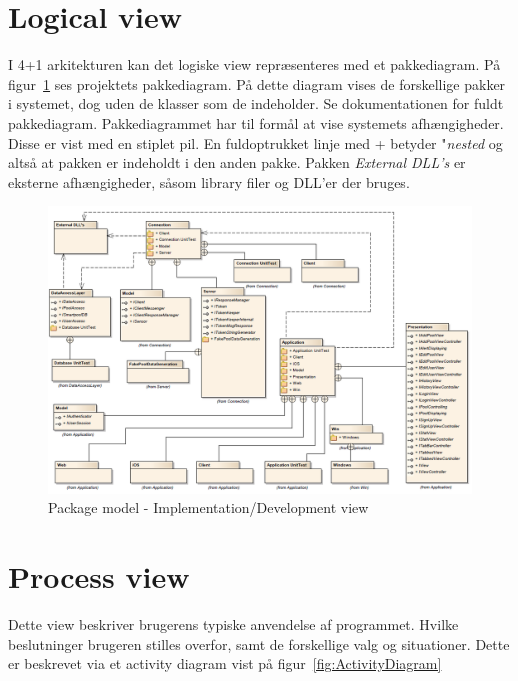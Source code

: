 \section{Logical view}
I 4+1 arkitekturen kan det logiske view repræsenteres med et pakkediagram.
På figur~\ref{fig:packageDiagram} ses projektets pakkediagram. På dette diagram vises de forskellige pakker i systemet, dog uden de klasser som de indeholder. Se dokumentationen for fuldt pakkediagram.
Pakkediagrammet har til formål at vise systemets afhængigheder. Disse er vist med en stiplet pil. En fuldoptrukket linje med + betyder "\textit{nested} og altså at pakken er indeholdt i den anden pakke. Pakken \textit{External DLL's} er eksterne afhængigheder, såsom library filer og DLL'er der bruges.

\begin{landscape}
	\begin{figure}[H]
		\centering
		\includegraphics[width=\linewidth]{figs/arkitektur/packageDiagramNoImpl.PNG}
		\caption{Package model - Implementation/Development view}
		\label{fig:packageDiagram}
	\end{figure}
\end{landscape}

\section{Process view}
Dette view beskriver brugerens typiske anvendelse af programmet. Hvilke beslutninger brugeren stilles overfor, samt de forskellige valg og situationer. Dette er beskrevet via et activity diagram vist på figur~\ref{fig:ActivityDiagram}

